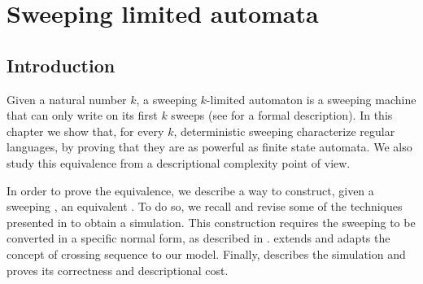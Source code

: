 \chapter{Sweeping limited automata}



\section{Introduction}
Given a natural number $k$, a sweeping $k$-limited automaton is a sweeping machine that can only write on its first $k$ sweeps (see  for a formal description).
In this chapter we show that, for every $k$, deterministic sweeping \kLAs characterize regular languages, by proving that they are as powerful as finite state automata. We also study this equivalence from a descriptional complexity point of view.

In order to prove the equivalence, we describe a way to construct, given a sweeping \kDLA, an equivalent \NFA.
To do so, we recall and revise some of the techniques presented in  to obtain a simulation.
This construction requires the sweeping \kDLA to be converted in a specific normal form, as described in .
 extends and adapts the concept of crossing sequence to our model.
Finally,  describes the simulation and proves its correctness and descriptional cost.



